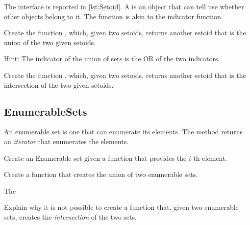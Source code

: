 
The \Setoid interface is reported in \cref{lst:Setoid}.
%
A \Setoid is an object that can tell use whether other objects belong to it.
The  function is akin to the indicator function.

\begin{codeexercise}
    Create the function , which, given two setoids, returns another setoid that is the union of the two given setoids.

    Hint: The indicator of the union of sets is the OR of the two indicators.
\end{codeexercise}

\begin{codeexercise}
    Create the function , which, given two setoids, returns another setoid that is the intersection of the two given setoids.
\end{codeexercise}


\subsection{EnumerableSets}

%
An enumerable set is one that can enumerate its elements.
The method  returns an \emph{iterator} that enumerates the elements.

\begin{codeexercise}
    Create an Enumerable set given a function that provides the $i$-th element.

\end{codeexercise}

\begin{codeexercise}
    Create a function that creates the union of two enumerable sets.

    The
\end{codeexercise}

\begin{codeexercise}
    Explain why it is not possible to create a function that, given two enumerable sets, creates the \emph{intersection} of the two sets.
\end{codeexercise}
